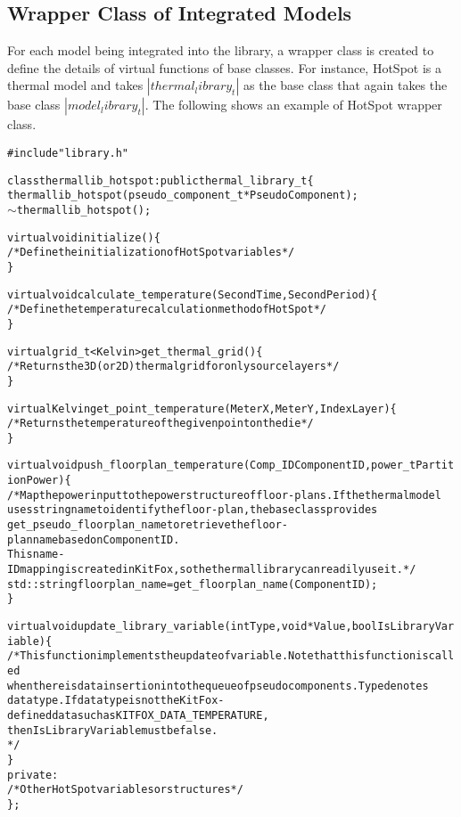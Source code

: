 \subsection{Wrapper Class of Integrated Models}
\noindent
For each model being integrated into the library, a wrapper class is created to define the details of virtual functions of base classes. 
For instance, HotSpot is a thermal model and takes $|thermal_library_t|$ as the base class that again takes the base class $|model_library_t|$. 
The following shows an example of HotSpot wrapper class.
{
\fontsize{10pt}{11pt}\selectfont
\begin{alltt}
#include "library.h"

class thermallib_hotspot : public thermal_library_t \{
    thermallib_hotspot(pseudo_component_t *PseudoComponent);
    \(\sim\)thermallib_hotspot();
    
    virtual void initialize() \{ 
        /* Define the initialization of HotSpot variables */ 
    \}
    
    virtual void calculate_temperature(Second Time, Second Period) \{
        /* Define the temperature calculation method of HotSpot */
    \}
    
    virtual grid_t<Kelvin> get_thermal_grid() \{
        /* Returns the 3D (or 2D) thermal grid for only source layers */
    \}
    
    virtual Kelvin get_point_temperature(Meter X, Meter Y, Index Layer) \{
        /* Returns the temperature of the given point on the die */
    \}
    
    virtual void push_floorplan_temperature(Comp_ID ComponentID, power_t PartitionPower) \{
        /* Map the power input to the power structure of floor-plans. If the thermal model 
        uses string name to identify the floor-plan, the base class provides
        get\_pseudo\_floorplan\_name to retrieve the floor-plan name based on ComponentID.
        This name-ID mapping is created in KitFox, so the thermal library can readily use it.*/
        std::string floorplan_name = get_floorplan_name(ComponentID);
    \}
    
    virtual void update_library_variable(int Type, void *Value, bool IsLibraryVariable) \{
        /* This function implements the update of variable. Note that this function is called 
        when there is data insertion into the queue of pseudo components. Type denotes
        data type. If data type is not the KitFox-defined data such as KITFOX\_DATA\_TEMPERATURE,
        then IsLibraryVariable must be false.
        */
    \}
private:
    /* Other HotSpot variables or structures */
\};
\end{alltt}
}

